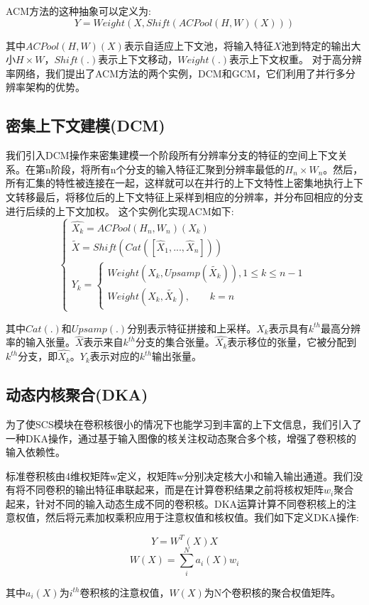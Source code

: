 \documentclass[hyperref]{ctexart}
\begin{document}
\begin{multicols}{2}
	ACM方法的这种抽象可以定义为:
	$$Y = Weight(X, Shift(ACPool(H,W)(X)))$$
	
	其中$ACPool(H,W)(X)$表示自适应上下文池，将输入特征$X$池到特定的输出大小$H\times W$，$Shift(.)$表示上下文移动，$ Weight(.)$表示上下文权重。
	对于高分辨率网络，我们提出了ACM方法的两个实例，DCM和GCM，它们利用了并行多分辨率架构的优势。
	\subsection{密集上下文建模(DCM)}
	我们引入DCM操作来密集建模一个阶段所有分辨率分支的特征的空间上下文关系。在第n阶段，将所有n个分支的输入特征汇聚到分辨率最低的$H_n\times W_n$。然后，所有汇集的特性被连接在一起，这样就可以在并行的上下文特性上密集地执行上下文转移最后，将移位后的上下文特征上采样到相应的分辨率，并分布回相应的分支进行后续的上下文加权。
	这个实例化实现ACM如下:
	$$\left\{\begin{array}{l}
		\hat{X_k} = ACPool(H_n, W_n)(X_k)\\
		\tilde{X} = Shift(Cat([\hat{X}_1,...,\hat{X}_n]))\\
		Y_k = \left\{\begin{array}{l}
		Weight(X_k, Upsamp(\tilde{X_k})), 1\leq k\leq n-1\\
		Weight(X_k, \tilde{X_k}), \qquad k=n
		\end{array}\right.
	\end{array}\right.$$

	其中$Cat(.)$和$Upsamp(.)$分别表示特征拼接和上采样。$X_k$表示具有$k^{th}$最高分辨率的输入张量。$\hat{X}$表示来自$k^{th}$分支的集合张量。$\hat{X_k}$表示移位的张量，它被分配到$k^{th}$分支，即$\hat{X_k}$。$Y_k$表示对应的$k^{th}$输出张量。
	\subsection{动态内核聚合(DKA)}
	为了使SCS模块在卷积核很小的情况下也能学习到丰富的上下文信息，我们引入了一种DKA操作，通过基于输入图像的核关注权动态聚合多个核，增强了卷积核的输入依赖性。
	
	标准卷积核由4维权矩阵w定义，权矩阵w分别决定核大小和输入输出通道。我们没有将不同卷积的输出特征串联起来，而是在计算卷积结果之前将核权矩阵${w_i}$聚合起来，针对不同的输入动态生成不同的卷积核。DKA运算计算不同卷积核上的注意权值，然后将元素加权乘积应用于注意权值和核权值。我们如下定义DKA操作:
	
	$$Y = W^T(X)X$$
	$$W(X) = \sum_{i}^{N}a_i(X)w_i$$
	
	其中$a_i(X)$为$i^{th}$卷积核的注意权值，$W(X)$为N个卷积核的聚合权值矩阵。
	

\end{multicols}
\end{document}
